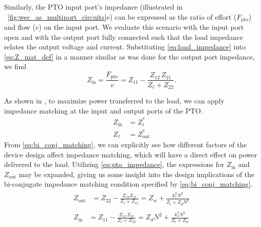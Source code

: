 \documentclass[5p,times]{elsarticle}
\begin{document}
Similarly, the PTO input port's impedance (illustrated in \figurename~\ref{fig:wec_as_multiport_circuits}e) can be expressed as the ratio of effort ($F_{\textrm{pto}}$) and flow ($v$) on the input port.
We evaluate this scenario with the input port open and with the output port fully connected such that the load impedance relates the output voltage and current.
Substituting \eqref{eq:load_impedance} into \eqref{eq:Z_mat_def} in a manner similar as was done for the output port impedance, we find
%
\begin{equation}
        Z_{\textrm{in}} = \frac{F_{\textrm{pto}}}{v}=  Z_{11} - \frac{Z_{12} \, Z_{21}}{Z_\ell + Z_{22}} .
        \label{eq:pto_input_port_impedance}
\end{equation}

As shown in  \cite{Bacelli:2021aa}, to maximize power transferred to the load, we can apply impedance matching at the input and output ports of the PTO.
%
\begin{subequations}
    \begin{align}
        Z_{\textrm{in}} &= Z_i^*                \label{eq:bi_conj_matching_in} \\ 
        Z_\ell          &= Z_{\textrm{out}}^*   \label{eq:bi_conj_matching_out}
    \end{align}
\label{eq:bi_conj_matching}%
\end{subequations}
%
From \eqref{eq:bi_conj_matching}, we can explicitly see how different factors of the device design affect impedance matching, which will have a direct effect on power delivered to the load.
Utilizing \eqref{eq:pto_impedance}, the expressions for $Z_{\textrm{in}}$ and $Z_{\textrm{out}}$ may be expanded, giving us some insight into the design implications of the bi-conjugate impedance matching condition specified by \eqref{eq:bi_conj_matching}.
%
\begin{subequations}
\begin{align}
        \begin{split}
                Z_{\textrm{out}} &=  Z_{22} - \frac{Z_{12} Z_{21}}{Z_{i} + Z_{11}} =  Z_w + \frac{k_\tau^2 N^2}{Z_i + Z_d N^2}
        \end{split}\label{eq:expanded_zin} \\[1em]
        \begin{split}
                Z_{\textrm{in}} &= Z_{11} - \frac{Z_{12} \, Z_{21}}{Z_\ell + Z_{22}}  = Z_d N^2 + \frac{k_\tau^2 N^2}{Z_\ell + Z_w}
        \end{split}\label{eq:expanded_zout}
\end{align}\label{eq:expanded_z}%
\end{subequations}
\end{document}
